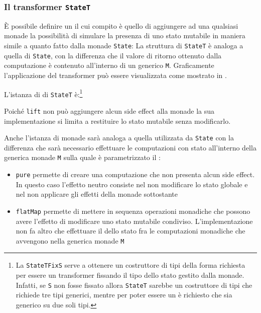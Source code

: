 \subsubsection{Il transformer \lstinline{StateT}}
È possibile definire un  il cui compito è quello di aggiungere ad una qualsiasi monade la possibilità di simulare la presenza di uno stato mutabile in maniera simile a quanto fatto dalla monade \lstinline{State}:
La struttura di \lstinline{StateT} è analoga a quella di \lstinline{State}, con la differenza che il valore di ritorno ottenuto dalla computazione è contenuto all'interno di un generico \lstinline{M}. Graficamente l'applicazione del transformer può essere visualizzata come mostrato in .



L'istanza di  di \lstinline{StateT} è:\footnote{La  \lstinline{StateTFixS} serve a ottenere un costruttore di tipi della forma richiesta per essere un transformer fissando il tipo dello stato gestito dalla monade. Infatti, se \lstinline{S} non fosse fissato allora \lstinline{StateT} sarebbe un costruttore di tipi che richiede tre tipi generici, mentre per poter essere un  è richiesto che sia generico su due soli tipi.}

Poiché \lstinline{lift} non può aggiungere alcun side effect alla monade la sua implementazione si limita a restituire lo stato mutabile senza modificarlo.

Anche l'istanza di monade sarà analoga a quella utilizzata da \lstinline{State} con la differenza che sarà necessario effettuare le computazioni con stato all'interno della generica monade \lstinline{M} sulla quale è parametrizzato il :
\begin{itemize}
  \item \lstinline{pure} permette di creare una computazione che non presenta alcun side effect. In questo caso l'effetto neutro consiste nel non modificare lo stato globale e nel non applicare gli effetti della monade sottostante
  \item \lstinline{flatMap} permette di mettere in sequenza operazioni monadiche che possono avere l'effetto di modificare uno stato mutabile condiviso. L'implementazione non fa altro che effettuare il  dello stato fra le computazioni monadiche che avvengono nella generica monade \lstinline{M}
\end{itemize}

